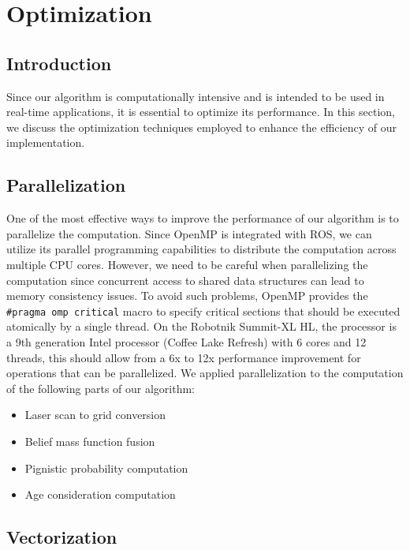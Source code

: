 
\section{Optimization}

\subsection{Introduction}

Since our algorithm is computationally intensive and is intended to be used in real-time applications, it is essential to optimize its performance.
In this section, we discuss the optimization techniques employed to enhance the efficiency of our implementation.

\subsection{Parallelization}

One of the most effective ways to improve the performance of our algorithm is to parallelize the computation.
Since OpenMP is integrated with ROS, we can utilize its parallel programming capabilities to distribute the computation across multiple CPU cores.
However, we need to be careful when parallelizing the computation since concurrent access to shared data structures can lead to memory consistency issues.
To avoid such problems, OpenMP provides the \texttt{\#pragma omp critical} macro to specify critical sections that should be executed atomically by a single thread.
On the Robotnik Summit-XL HL, the processor is a 9th generation Intel processor (Coffee Lake Refresh) with 6 cores and 12 threads, this should allow from a 6x to 12x performance improvement for operations that can be parallelized.
We applied parallelization to the computation of the following parts of our algorithm:
\begin{itemize}
    \item Laser scan to grid conversion
    \item Belief mass function fusion
    \item Pignistic probability computation
    \item Age consideration computation
\end{itemize}

\subsection{Vectorization}

